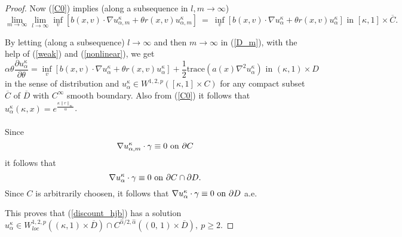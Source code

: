 \documentclass[11pt]{amsart}
\numberwithin{equation}{section}
\begin{document}
\begin{proof}
Now (\ref{C0}) implies (along a subsequence in $l, m \to \infty$)
\begin{equation}\label{nonlinear}
 \lim_{m \to \infty} \lim_{l \to \infty} \inf_{v} \left[ b(x,v)\cdot 
\nabla u^{\kappa}_{\alpha,m} + \theta r(x,v)u^{\kappa}_{\alpha,m}\right]
\ = \  \inf_{v} \left[ b(x,v)\cdot 
\nabla u^{\kappa}_{\alpha} + \theta r(x,v)u^{\kappa}_{\alpha}\right] \mbox{ in } [\kappa,1] \times 
\overline{C}.
\end{equation}

By letting (along a subsequence) 
$l \to \infty$ and then  $m\longrightarrow \infty$  in (\ref{D_m}), with the help of (\ref{weak}) and (\ref{nonlinear}), we get
\begin{equation}
 \alpha\theta\frac{\partial u^{\kappa}_{\alpha}}{\partial \theta}=  \inf_{v} \left[ b(x,v)\cdot 
\nabla u^{\kappa}_{\alpha} + \theta r(x,v)u^{\kappa}_{\alpha}\right] +\frac{1}{2}
\mbox{trace}(a(x)\nabla^2 u^{\kappa}_{\alpha}) \mbox{ in } (\kappa,1)\times D 
\end{equation}
in the sense of distribution and $u^{\kappa}_{\alpha} \in W^{1,2, p}([\kappa,1]\times C) $ for any
compact subset $\overline{C}$ of $\overline{D}$ with $C^\infty$ smooth boundary.  
Also from (\ref{C0}) it follows that $u^{\kappa}_{\alpha}(\kappa,x) = e^{\frac{\kappa \|r\|_{\infty}}{\alpha}}$.
\\
 \paragraph{}  Since
\[
\nabla u^\kappa_{\alpha, m} \cdot \gamma \equiv 0 \ {\rm on} \ \partial C
\]
it follows that 
\[
\nabla u^\kappa_{\alpha} \cdot \gamma \equiv 0 \ {\rm on} \ \partial C \cap \partial D.
\]
Since $C$ is arbitrarily choosen, it follows that
 $\nabla u^\kappa_{\alpha} \cdot \gamma \equiv 0 \ {\rm on}  \ \partial D $ a.e. 

This proves that (\ref{discount_hjb}) has a solution  $ u^{\kappa}_{\alpha} \in W^{1,2, p}_{loc}((\kappa,1)\times \overline{D} ) \cap C^{\hat{\alpha}/2, \hat{\alpha}}
((0, \, 1) \times \overline{D} ), \ p\geq 2$. 

\end{proof}
\end{document}
